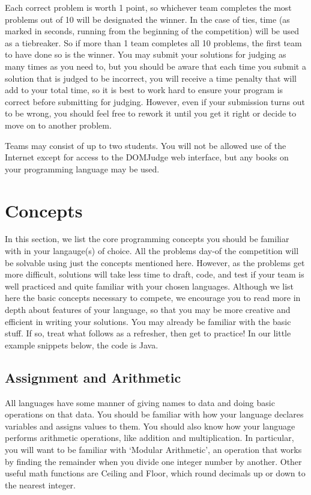 \documentclass[a4paper]{article}
\begin{document}
Each correct problem is worth 1 point, so whichever team completes the most problems out of 10 will be designated the winner. In the case of ties, time (as marked in seconds, running from the beginning of the competition) will be used as a tiebreaker. So if more than 1 team completes all 10 problems, the first team to have done so is the winner. You may submit your solutions for judging as many times as you need to, but you should be aware that each time you submit a solution that is judged to be incorrect, you will receive a time penalty that will add to your total time, so it is best to work hard to ensure your program is correct before submitting for judging. However, even if your submission turns out to be wrong, you should feel free to rework it until you get it right or decide to move on to another problem. 

Teams may consist of up to two students. You will not be allowed use of the Internet except for access to the DOMJudge web interface, but any books on your programming language may be used. 

\newpage

\section{Concepts}

In this section, we list the core programming concepts you should be familiar with in your langauge(s) of choice. All the problems day-of the competition will be solvable using just the concepts mentioned here. However, as the problems get more difficult, solutions will take less time to draft, code, and test if your team is well practiced and quite familiar with your chosen languages. Although we list here the basic concepts necessary to compete, we encourage you to read more in depth about features of your language, so that you may be more creative and efficient in writing your solutions. You may already be familiar with the basic stuff. If so, treat what follows as a refresher, then get to practice! In our little example snippets below, the code is Java.

\subsection{Assignment and Arithmetic}
All languages have some manner of giving names to data and doing basic operations on that data. You should be familiar with how your language declares variables and assigns values to them. You should also know how your language performs arithmetic operations, like addition and multiplication. In particular, you will want to be familiar with `Modular Arithmetic', an operation that works by finding the remainder when you divide one integer number by another. Other useful math functions are Ceiling and Floor, which round decimals up or down to the nearest integer.
\end{document}
